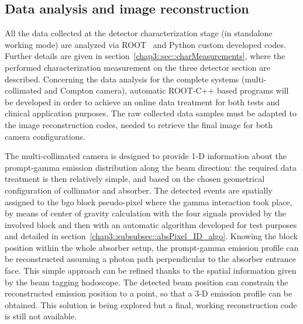 
\subsection{Data analysis and image reconstruction}\label{chap3::subsec::dataAnalysis}

All the data collected at the detector characterization stage (in standalone working mode) are analyzed via ROOT~\parencite{Brun1997} and Python custom developed codes. Further details are given in section~\ref{chap3::sec::charMeasurements}, where the performed characterization measurement on the three detector section are described. Concerning the data analysis for the complete systems (multi-collimated and Compton camera), automatic ROOT-C++ based programs will be developed in order to achieve an online data treatment for both tests and clinical application purposes. The raw collected data samples must be adapted to the image reconstruction codes, needed to retrieve the final image for both camera configurations.

The multi-collimated camera is designed to provide 1-D information about the prompt-gamma emission distribution along the beam direction: the required data treatment is then relatively simple, and based on the chosen geometrical configuration of collimator and absorber. The detected events are spatially assigned to the \gls{bgo} block pseudo-pixel where the gamma interaction took place, by means of center of gravity calculation with the four signals provided by the involved block and then with an automatic algorithm developed for test purposes and detailed in section~\ref{chap3::subsubsec::absPixel_ID_algo}. Knowing the block position within the whole absorber setup, the prompt-gamma emission profile can be reconstructed assuming a photon path perpendicular to the absorber entrance face. This simple approach can be refined thanks to the spatial information given by the beam tagging hodoscope. The detected beam position can constrain the reconstructed emission position to a point, so that a 3-D emission profile can be obtained. This solution is being explored but a final, working reconstruction code is still not available.

